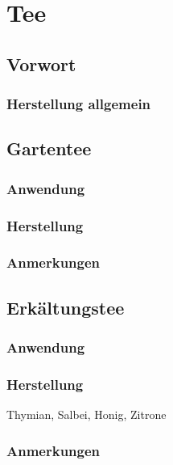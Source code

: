 \chapter{Tee}


\section{Vorwort}

\subsection{Herstellung allgemein}



\section{Gartentee}

\subsection{Anwendung}

\subsection{Herstellung}

\subsection{Anmerkungen}




\section{Erkältungstee}

\subsection{Anwendung}

\subsection{Herstellung}

Thymian, Salbei, Honig, Zitrone



\subsection{Anmerkungen}